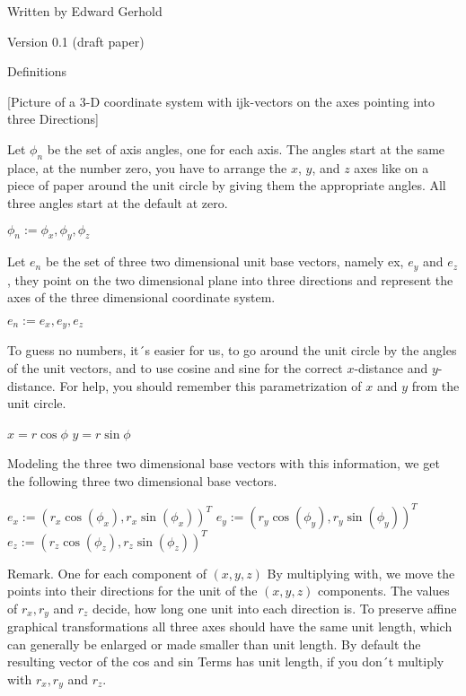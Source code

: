 \documentclass{letter}
\begin{document}
\begin{center}
\Large{}
\end{center}

Written by Edward Gerhold

Version 0.1 (draft paper)

Definitions

[Picture of a 3-D coordinate system with ijk-vectors on the axes pointing
into three Directions]

Let $\phi_n$ be the set of axis angles, one for each axis. The angles start
at the same place, at the number zero, you have to arrange the $x$, $y$, and
$z$ axes like on a piece of paper around the unit circle by giving them the
appropriate angles. All three angles start at the default at zero.

$\phi_n := { \phi_x, \phi_y, \phi_z }$

Let $e_n$ be the set of three two dimensional unit base vectors, namely ex,
$e_y$ and $e_z$, they point on the two dimensional plane into three directions
and represent the axes of the three dimensional coordinate system.

$e_n := { e_x, e_y, e_z }$
 
To guess no numbers, it´s easier for us, to go around the unit circle by
the angles of the unit vectors, and to use cosine and sine for the correct
$x$-distance and $y$-distance. For help, you should remember this parametrization
of $x$ and $y$ from the unit circle.

$x = r \cos \phi$
$y = r \sin \phi$

Modeling the three two dimensional base vectors with this information,
we get the following three two dimensional base vectors. 


$e_x := (r_x\cos(\phi_x), r_x\sin(\phi_x) )^T$
$e_y := (r_y\cos(\phi_y), r_y\sin(\phi_y) )^T$
$e_z := (r_z\cos(\phi_z), r_z\sin(\phi_z) )^T$


Remark. One for each component of $(x,y,z)$ By multiplying with, we move the 
points into their directions for the unit of the $(x,y,z)$ components.
The values of $r_x, r_y$ and $r_z$ decide, how long one unit into each
direction is. To preserve affine graphical transformations all three
axes should have the same unit length, which can generally be enlarged
or made smaller than unit length. By default the resulting vector of the cos 
and sin Terms has unit length, if you don´t multiply with $r_x, r_y$ and $r_z$. 
\end{document}
